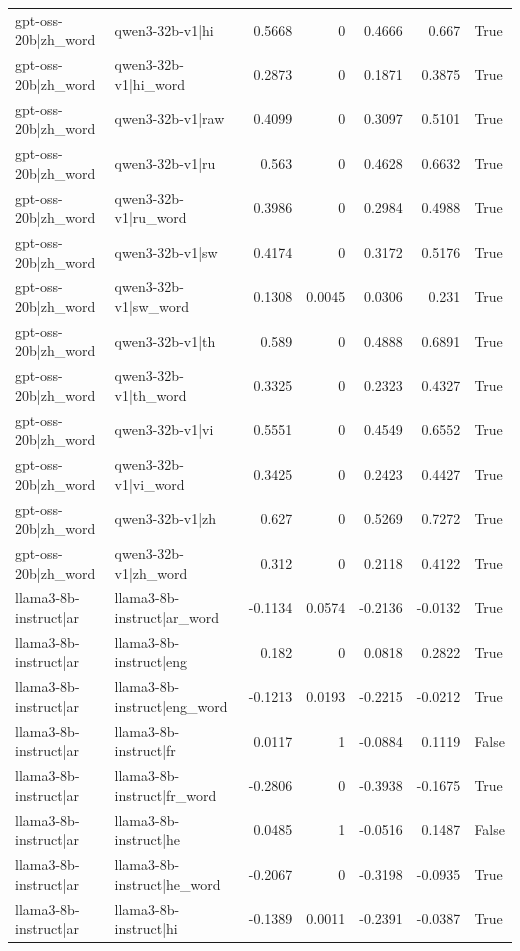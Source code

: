 \begin{table}
\begin{tabular}{l l r r r r l}
gpt-oss-20b|zh_word & qwen3-32b-v1|hi & 0.5668 & 0 & 0.4666 & 0.667 & True \\
gpt-oss-20b|zh_word & qwen3-32b-v1|hi_word & 0.2873 & 0 & 0.1871 & 0.3875 & True \\
gpt-oss-20b|zh_word & qwen3-32b-v1|raw & 0.4099 & 0 & 0.3097 & 0.5101 & True \\
gpt-oss-20b|zh_word & qwen3-32b-v1|ru & 0.563 & 0 & 0.4628 & 0.6632 & True \\
gpt-oss-20b|zh_word & qwen3-32b-v1|ru_word & 0.3986 & 0 & 0.2984 & 0.4988 & True \\
gpt-oss-20b|zh_word & qwen3-32b-v1|sw & 0.4174 & 0 & 0.3172 & 0.5176 & True \\
gpt-oss-20b|zh_word & qwen3-32b-v1|sw_word & 0.1308 & 0.0045 & 0.0306 & 0.231 & True \\
gpt-oss-20b|zh_word & qwen3-32b-v1|th & 0.589 & 0 & 0.4888 & 0.6891 & True \\
gpt-oss-20b|zh_word & qwen3-32b-v1|th_word & 0.3325 & 0 & 0.2323 & 0.4327 & True \\
gpt-oss-20b|zh_word & qwen3-32b-v1|vi & 0.5551 & 0 & 0.4549 & 0.6552 & True \\
gpt-oss-20b|zh_word & qwen3-32b-v1|vi_word & 0.3425 & 0 & 0.2423 & 0.4427 & True \\
gpt-oss-20b|zh_word & qwen3-32b-v1|zh & 0.627 & 0 & 0.5269 & 0.7272 & True \\
gpt-oss-20b|zh_word & qwen3-32b-v1|zh_word & 0.312 & 0 & 0.2118 & 0.4122 & True \\
llama3-8b-instruct|ar & llama3-8b-instruct|ar_word & -0.1134 & 0.0574 & -0.2136 & -0.0132 & True \\
llama3-8b-instruct|ar & llama3-8b-instruct|eng & 0.182 & 0 & 0.0818 & 0.2822 & True \\
llama3-8b-instruct|ar & llama3-8b-instruct|eng_word & -0.1213 & 0.0193 & -0.2215 & -0.0212 & True \\
llama3-8b-instruct|ar & llama3-8b-instruct|fr & 0.0117 & 1 & -0.0884 & 0.1119 & False \\
llama3-8b-instruct|ar & llama3-8b-instruct|fr_word & -0.2806 & 0 & -0.3938 & -0.1675 & True \\
llama3-8b-instruct|ar & llama3-8b-instruct|he & 0.0485 & 1 & -0.0516 & 0.1487 & False \\
llama3-8b-instruct|ar & llama3-8b-instruct|he_word & -0.2067 & 0 & -0.3198 & -0.0935 & True \\
llama3-8b-instruct|ar & llama3-8b-instruct|hi & -0.1389 & 0.0011 & -0.2391 & -0.0387 & True \\

\end{tabular}
\end{table}
